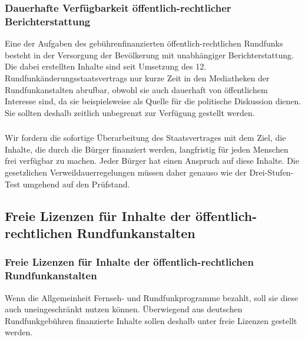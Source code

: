 \subsubsection{Dauerhafte Verfügbarkeit öffentlich-rechtlicher Berichterstattung}
\abstimmung
Eine der Aufgaben des gebührenfinanzierten öffentlich-rechtlichen Rundfunks besteht in der Versorgung der Bevölkerung mit unabhängiger Berichterstattung. Die dabei erstellten Inhalte sind seit Umsetzung des 12. Rundfunkänderungsstaatsvertrags nur kurze Zeit in den Mediatheken der Rundfunkanstalten abrufbar, obwohl sie auch dauerhaft von öffentlichem Interesse sind, da sie beispielsweise als Quelle für die politische Diskussion dienen. Sie sollten deshalb zeitlich unbegrenzt zur Verfügung gestellt werden.
 

\subsubsection{ }
\abstimmung
Wir fordern die sofortige Überarbeitung des Staatsvertrages mit dem Ziel, die Inhalte, die durch die Bürger finanziert werden, langfristig für jeden Menschen frei verfügbar zu machen. Jeder Bürger hat einen Anspruch auf diese Inhalte. Die gesetzlichen Verweildauerregelungen müssen daher genauso wie der Drei-Stufen-Test umgehend auf den Prüfstand.
 
\subsection*{Freie Lizenzen für Inhalte der öffentlich-rechtlichen Rundfunkanstalten}

\subsubsection{Freie Lizenzen für Inhalte der öffentlich-rechtlichen Rundfunkanstalten}
\abstimmung
Wenn die Allgemeinheit Fernseh- und Rundfunkprogramme bezahlt, soll sie diese auch uneingeschränkt nutzen können. Überwiegend aus deutschen Rundfunkgebühren finanzierte Inhalte sollen deshalb unter freie Lizenzen gestellt werden.
